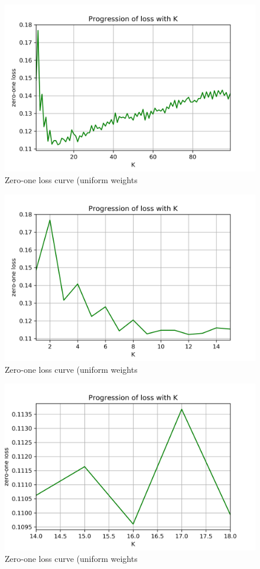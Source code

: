 \documentclass[a4paper]{article}
\begin{document}
\begin{figure}[H]
    \centering
    \includegraphics[width=12cm]{error_uniform}
    \caption{Zero-one loss curve (uniform weights}
    \label{fig:ex2-b-error_uniform_0}
\end{figure}

\begin{figure}[H]
    \centering
    \includegraphics[width=12cm]{error_uniform_(mid_zoom)}
    \caption{Zero-one loss curve (uniform weights}
    \label{fig:ex2-b-error_uniform_1}
\end{figure}

\begin{figure}[H]
    \centering
    \includegraphics[width=12cm]{error_uniform_(full_zoom)}
    \caption{Zero-one loss curve (uniform weights}
    \label{fig:ex2-b-error_uniform_2}
\end{figure}
\end{document}
